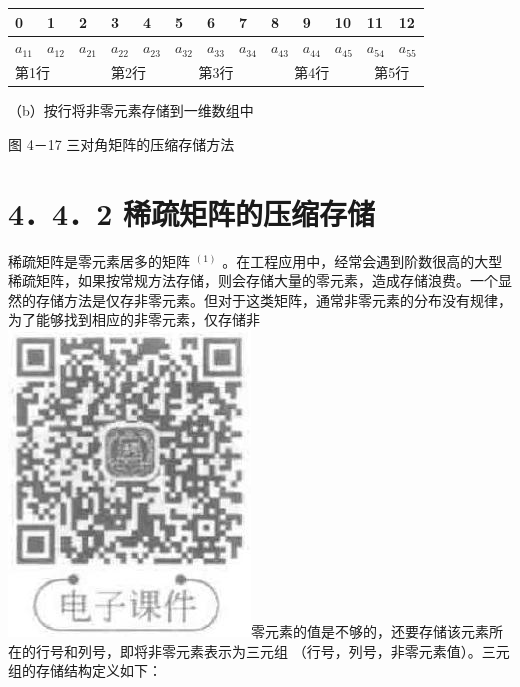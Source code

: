 \documentclass[10pt]{article}
\begin{document}
\begin{center}
\begin{tabular}{|l|l|l|l|l|l|l|l|l|l|l|l|l|}
\hline
0 & 1 & 2 & 3 & 4 & 5 & 6 & 7 & 8 & 9 & 10 & 11 & 12 \\
\hline
$a_{11}$ & $a_{12}$ & $a_{21}$ & $a_{22}$ & $a_{23}$ & $a_{32}$ & $a_{33}$ & $a_{34}$ & $a_{43}$ & $a_{44}$ & $a_{45}$ & $a_{54}$ & $a_{55}$ \\
\hline
\multicolumn{3}{|l|}{第1行} & \multicolumn{2}{|l|}{第2行} & \multicolumn{3}{|c|}{第3行} & \multicolumn{3}{|c|}{第4行} & \multicolumn{2}{|c|}{第5行} \\
\hline
\end{tabular}
\end{center}

（b）按行将非零元素存储到一维数组中

图 4－17 三对角矩阵的压缩存储方法

\section*{4．4．2 稀疏矩阵的压缩存储}
稀疏矩阵是零元素居多的矩阵 ${ }^{(1)}$ 。在工程应用中，经常会遇到阶数很高的大型稀疏矩阵，如果按常规方法存储，则会存储大量的零元素，造成存储浪费。一个显然的存储方法是仅存非零元素。但对于这类矩阵，通常非零元素的分布没有规律，为了能够找到相应的非零元素，仅存储非\\
\includegraphics[max width=\textwidth]{2025_06_06_704745ea57b15b2333e5g-125}零元素的值是不够的，还要存储该元素所在的行号和列号，即将非零元素表示为三元组 （行号，列号，非零元素值）。三元组的存储结构定义如下：
\end{document}

